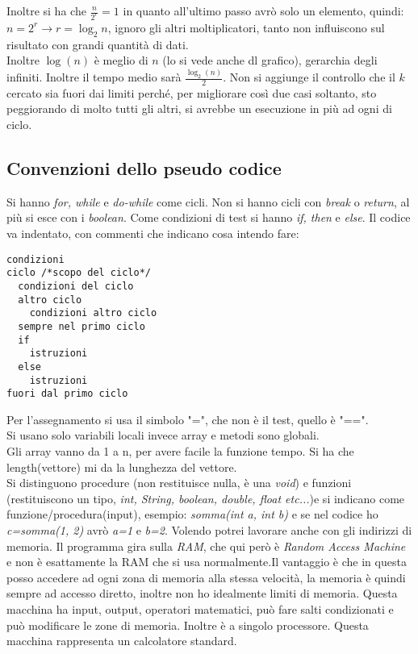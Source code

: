 \documentclass[a4paper,12pt,oneside,tikz]{book}
\begin{document}
Inoltre si ha che $\frac{n}{2^r}=1$ in quanto all'ultimo passo avrò solo un elemento, quindi: $n=2^r\rightarrow r=\log_2 n$, ignoro gli altri moltiplicatori, tanto non influiscono sul risultato con grandi quantità di dati.\\
Inoltre $\log(n)$ è meglio di $n$ (lo si vede anche dl grafico), gerarchia degli infiniti. Inoltre il tempo medio sarà $\frac{\log_2(n)}{2}$.
Non si aggiunge il controllo che il $k$ cercato sia fuori dai limiti perché, per migliorare così due casi soltanto, sto peggiorando di molto tutti gli altri, si avrebbe un esecuzione in più ad ogni di ciclo.
\newpage
\subsection{Convenzioni dello pseudo codice}
Si hanno \textit{for, while} e \textit{do-while} come cicli. Non si hanno cicli con \textit{break} o \textit{return}, al più si esce con i \textit{boolean}. Come condizioni di test si hanno \textit{if, then} e \textit{else}. Il codice va indentato, con commenti che indicano cosa intendo fare:
\begin{verbatim}
condizioni
ciclo /*scopo del ciclo*/
  condizioni del ciclo
  altro ciclo
    condizioni altro ciclo
  sempre nel primo ciclo
  if
    istruzioni
  else 
    istruzioni
fuori dal primo ciclo
\end{verbatim}
Per l'assegnamento si usa il simbolo "=", che non è il test, quello è "==".\\
Si usano solo variabili locali invece array e metodi sono globali.\\
Gli array vanno da 1 a n, per avere facile la funzione tempo. Si ha che length(vettore) mi da la lunghezza del vettore.\\Si distinguono procedure (non restituisce nulla, è una \textit{void}) e funzioni (restituiscono un tipo, \textit{int, String, boolean, double, float etc...})e si indicano come funzione/procedura(input), esempio: \textit{somma(int a, int b)} e se nel codice ho \textit{c=somma(1, 2)} avrò \textit{a=1} e \textit{b=2}. Volendo potrei lavorare anche con gli indirizzi di memoria. Il programma gira sulla \textit{RAM}, che qui però è \textit{Random Access Machine} e non è esattamente la RAM che si usa normalmente.Il vantaggio è che in questa posso accedere ad ogni zona di memoria alla stessa velocità, la memoria è quindi sempre ad accesso diretto, inoltre non ho idealmente limiti di memoria. Questa macchina ha input, output, operatori matematici, può fare salti condizionati  e può modificare le zone di memoria. Inoltre è a singolo processore. Questa macchina rappresenta un calcolatore standard.
\newpage
\end{document}
